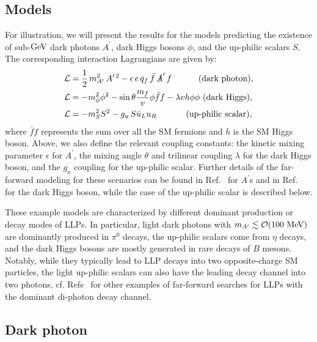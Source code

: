 \documentclass[prd,twocolumn,reprint,preprintnumbers,nofootinbib]{revtex4-1}
\begin{document}
\subsection{Models\label{sec:models}}

For illustration, we will present the results for the models predicting the existence of sub-$\text{GeV}$ dark photons $A^\prime$, dark Higgs bosons $\phi$, and the up-philic scalars $S$. The corresponding interaction Lagrangians are given by:
\begin{align}
\label{eq:LAprime}
\mathcal{L} & = \frac{1}{2}\,m_{A'}^2\,A^{\prime\,2} - \epsilon\,e\,q_f\,\bar{f}\,\slashed{A}^\prime\,f\hspace{1.1cm}(\textrm{dark photon}),\\
\label{eq:darkHiggseffL}
\mathcal{L} & = -m_\phi^{2} \phi^2 - \sin{\theta} \frac{m_f}{v} \phi \bar{f} f  
-  \lambda vh \phi\phi\,\,(\textrm{dark Higgs}),\\
\label{eq:Lupphilicscalar}
\mathcal{L} & = -m_S^{2} S^2 - g_u\,S \bar{u}_L u_R  \hspace{1.2cm} (\textrm{up-philic scalar}),
\end{align}
where $\bar{f}f$ represents the sum over all the SM fermions and $h$ is the SM Higgs boson. Above, we also define the relevant coupling constants: the kinetic mixing parameter $\epsilon$ for $A^\prime$, the mixing angle $\theta$ and trilinear coupling $\lambda$ for the dark Higgs boson, and the $g_u$ coupling for the up-philic scalar. Further details of the far-forward modeling for these scenarios can be found in Ref.~\cite{Feng:2017uoz} for $A^\prime$s and in Ref.~\cite{Feng:2017vli} for the dark Higgs boson, while the case of the up-philic scalar is described below.

These example models are characterized by different dominant production or decay modes of LLPs. In particular, light dark photons with $m_{A^\prime}\lesssim \mathcal{O}(100~\text{MeV})$ are dominantly produced in $\pi^0$ decays, the up-philic scalars come from $\eta$ decays, and the dark Higgs bosons are mostly generated in rare decays of $B$ mesons. Notably, while they typically lead to LLP decays into two opposite-charge SM particles, the light up-philic scalars can also have the leading decay channel into two photons, cf. Refs~\cite{Feng:2018noy,Kling:2020mch} for other examples of far-forward searches for LLPs with the dominant di-photon decay channel.  

\subsection{Dark photon}
\label{sec:darkphoton} 
\end{document}

